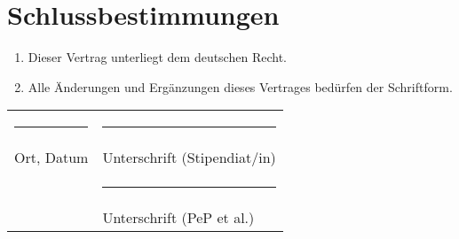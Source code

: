 \documentclass[
  paper=a4,
  fontsize=12pt,
  DIV=16,
  parskip=full,
  headinclude=true,
]{scrartcl}
\begin{document}
\section{Schlussbestimmungen}

\begin{enumerate}[\qquad(1)]
	\item Dieser Vertrag unterliegt dem deutschen Recht.
	\item Alle Änderungen und Ergänzungen dieses Vertrages bedürfen der
		Schriftform.
\end{enumerate}

\vspace{2cm}
\begin{tabular}{@{}p{}@{}p{}@{}}%
\rule{6cm}{1pt} & \rule{7cm}{1pt} \\
Ort, Datum & Unterschrift (Stipendiat/in)\\[2cm]
 & \rule{7cm}{1pt} \\
 & Unterschrift (PeP et al.)
\end{tabular}
\end{document}
